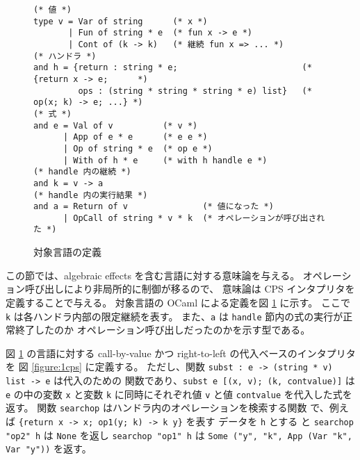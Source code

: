 \begin{figure}[t]
\begin{verbatim}
(* 値 *)
type v = Var of string      (* x *)
       | Fun of string * e  (* fun x -> e *)
       | Cont of (k -> k)   (* 継続 fun x => ... *)
(* ハンドラ *)
and h = {return : string * e;                         (* {return x -> e;      *)
         ops : (string * string * string * e) list}   (*  op(x; k) -> e; ...} *)
(* 式 *)
and e = Val of v          (* v *)
      | App of e * e      (* e e *)
      | Op of string * e  (* op e *)
      | With of h * e     (* with h handle e *)
(* handle 内の継続 *)
and k = v -> a
(* handle 内の実行結果 *)
and a = Return of v               (* 値になった *)
      | OpCall of string * v * k  (* オペレーションが呼び出された *)
\end{verbatim}
\caption{対象言語の定義}
\label{figure:syntax}
\end{figure}

この節では、algebraic effects を含む言語に対する意味論を与える。
オペレーション呼び出しにより非局所的に制御が移るので、
意味論は CPS インタプリタを定義することで与える。
対象言語の OCaml による定義を図 \ref{figure:syntax} に示す。
ここで \texttt{k} は各ハンドラ内部の限定継続を表す。
また、\texttt{a} は \texttt{handle} 節内の式の実行が正常終了したのか
オペレーション呼び出しだったのかを示す型である。



図 \ref{figure:syntax} の言語に対する
call-by-value かつ right-to-left の代入ベースのインタプリタを
図 \ref{figure:1cps} に定義する。
ただし、関数 \texttt{subst :\ e -> (string * v) list -> e} は代入のための
関数であり、\texttt{subst e [(x, v); (k, cont\US value)]} は \texttt{e}
の中の変数 \texttt{x} と変数 \texttt{k} に同時にそれぞれ値 \texttt{v}
と値 \texttt{cont\US value} を代入した式を返す。
関数 \texttt{search\US op} はハンドラ内のオペレーションを検索する関数
で、例えば \texttt{\{return x -> x; op1(y; k) -> k y\}} を表す
データを \texttt{h} とする
と \texttt{search\US op "op2" h} は \texttt{None} を返し
\texttt{search\US op "op1" h} は \texttt{Some ("y", "k", App (Var "k", Var
"y"))} を返す。


